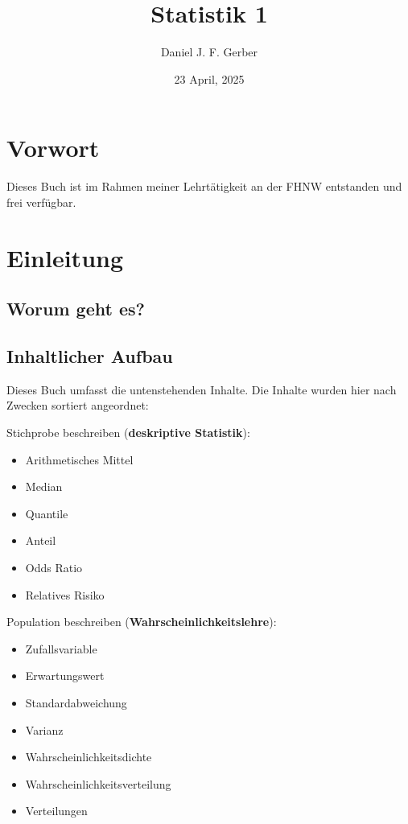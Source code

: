 \documentclass[
]{book}
\title{Statistik 1}
\author{Daniel J. F. Gerber}
\date{23 April, 2025}
\providecommand{\tightlist}{%
  \setlength{\itemsep}{0pt}\setlength{\parskip}{0pt}}
\theoremstyle{definition}
\theoremstyle{definition}
\theoremstyle{definition}
\theoremstyle{definition}
\theoremstyle{remark}
\begin{document}
\maketitle

{
\setcounter{tocdepth}{1}
\tableofcontents
}
\chapter*{Vorwort}\label{vorwort}

Dieses Buch ist im Rahmen meiner Lehrtätigkeit an der FHNW entstanden und frei verfügbar.

\chapter{Einleitung}\label{einleitung}

\section{Worum geht es?}\label{worum-geht-es}

\section{Inhaltlicher Aufbau}\label{inhaltlicher-aufbau}

Dieses Buch umfasst die untenstehenden Inhalte. Die Inhalte wurden hier nach Zwecken sortiert angeordnet:

Stichprobe beschreiben (\textbf{deskriptive Statistik}):

\begin{itemize}
\tightlist
\item
  Arithmetisches Mittel
\item
  Median
\item
  Quantile
\item
  Anteil
\item
  Odds Ratio
\item
  Relatives Risiko
\end{itemize}

Population beschreiben (\textbf{Wahrscheinlichkeitslehre}):

\begin{itemize}
\tightlist
\item
  Zufallsvariable
\item
  Erwartungswert
\item
  Standardabweichung
\item
  Varianz
\item
  Wahrscheinlichkeitsdichte
\item
  Wahrscheinlichkeitsverteilung
\item
  Verteilungen
\end{itemize}
\end{document}
